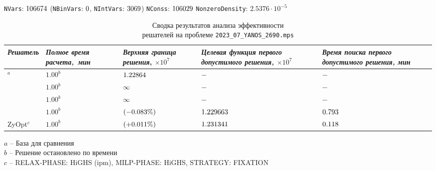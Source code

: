 \documentclass[%
	11pt,
	a4paper,
	utf8,
		]{article}
\begin{document}
\vspace*{-20mm}
{%
	\begin{table}[!h]
		\centering
		\caption{Сводка результатов анализа эффективности \\решателей на проблеме \texttt{2023\_07\_YANOS\_2690.mps}}
		
		{\footnotesize \texttt{NVars}: $ 106674 $ (\texttt{NBinVars}: $ 0 $,  \texttt{NIntVars}: $ 3069 $) \texttt{NConss}: $ 106029 $ \texttt{NonzeroDensity}: $ 2.5376 \cdot 10^{-5} $}\\[2mm]

		\begin{tabular}{ p{2.9cm} | p{2.5cm} p{3.4cm} p{3.6cm} p{3.2cm} }
			\rowcolor{black!5}\emph{Решатель} & \emph{Полное время \mbox{расчета, мин}} & \emph{Верхняя граница} \mbox{\itshape решения}, $ \times 10^{7} $ & \emph{Целевая функция первого допустимого решения, $ \times 10^7 $} & \emph{Время поиска первого допустимого решения, мин} \\
			\hline
			\rowcolor{blue!3}{CPLEX 12.8.0.0}$ ^a $ & $ 1.00^b $ & $ \fpeval{trunc(\cplexObjA, 6)} $ & $ - $ & $ - $ \\
			\rowcolor{black!5}{CBC} & $ 1.00^b $ & $ \infty $ & $ - $ & $ - $ \\
			\rowcolor{blue!3}{SCIP 8.0.3} & $ 1.00^b $ & $ \infty $ & $ - $ & $ - $ \\
			\rowcolor{black!5}{HiGHS 1.5.3} & $ 1.00^b $ & \ccb{$ \ccb{\fpeval{trunc(\highsObjA, 6)}} $} $ (\fpeval{trunc(\cplexHighsObjRelA, 3)}\%) $ & $ \fpeval{trunc(\firstSolHighsObjA, 6)} $ & $ \fpeval{trunc(\firstSolHighsTimeA, 3)} $ \\
			\rowcolor{blue!3}ZyOpt$^c$ & $ 1.00^b $  & \ccg{$ \fpeval{trunc(\zyoptObjA, 6)} $} $ (+\fpeval{trunc(\cplexZyoptObjRelA, 3)}\%) $ & $ \fpeval{trunc(\firstSolZyoptObjA, 6)} $ & $ \fpeval{trunc(\firstSolZyoptTimeA, 3)} $ \\
		\end{tabular}
	
	\end{table}
	\vspace*{-3mm}
\hspace*{5mm}$ a $ -- {\footnotesize База для сравнения}\\[-7mm]

\hspace*{5mm}$ b $ -- {\footnotesize Решение остановлено по времени}\\[-7mm]

\hspace*{5mm}$ c $ -- {\footnotesize RELAX-PHASE: HiGHS (ipm), MILP-PHASE: HiGHS, STRATEGY: FIXATION}
}
\end{document}

